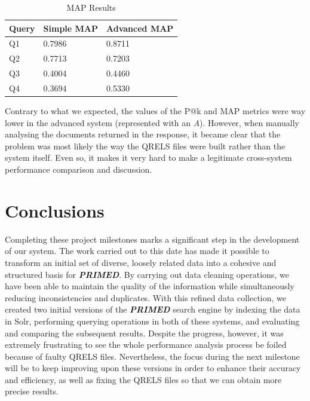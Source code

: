 \documentclass[sigconf]{acmart}
\begin{document}
\begin{table}[H]
	\begin{tabular}{ | m{5em} | m{1cm}| m{1.2cm} | }
		\hline
		Query& Simple MAP & Advanced MAP \\
		\hline
		Q1 & 0.7986 & 0.8711 \\
		\hline
		Q2 & 0.7713 & 0.7203 \\
		\hline
		Q3 & 0.4004 & 0.4460 \\
		\hline
		Q4 & 0.3694 & 0.5330 \\
		\hline
	\end{tabular}
	\caption{MAP Results}
	\label{tab:map_results}
\end{table}
Contrary to what we expected, the values of the P@k and MAP metrics were way lower in the advanced system (represented with an \textit{A}). However, when manually analysing the documents returned in the response, it became clear that the problem was most likely the way the QRELS files were built rather than the system itself. Even so, it makes it very hard to make a legitimate cross-system performance comparison and discussion.

\section{Conclusions}

Completing these project milestones marks a significant step in the development of our system. The work carried out to this date has made it possible to transform an initial set of diverse, loosely related data into a cohesive and structured basis for \textit{\textbf{PRIMED}}. By carrying out data cleaning operations, we have been able to maintain the quality of the information while simultaneously reducing inconsistencies and duplicates. With this refined data collection, we created two initial versions of the \textit{\textbf{PRIMED}} search engine by indexing the data in Solr, performing querying operations in both of these systems, and evaluating and comparing the subsequent results. Despite the progress, however, it was extremely frustrating to see the whole performance analysis process be foiled because of faulty QRELS files. Nevertheless, the focus during the next milestone will be to keep improving upon these versions in order to enhance their accuracy and efficiency, as well as fixing the QRELS files so that we can obtain more precise results.



\end{document}

